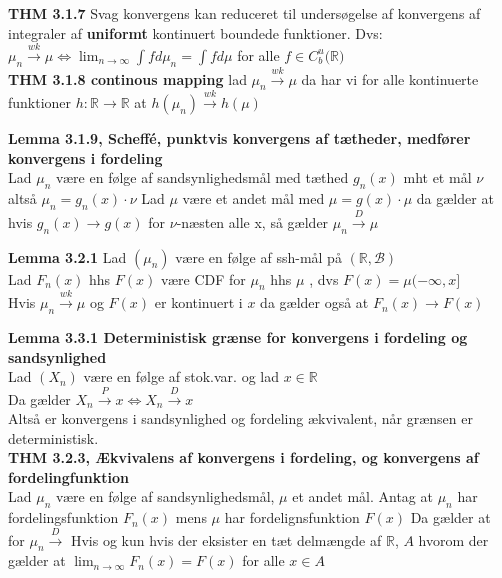 \textbf{THM 3.1.7}
Svag konvergens kan reduceret til undersøgelse af konvergens af integraler af \textbf{uniformt} kontinuert boundede funktioner. Dvs: $\mu_n  \xrightarrow{wk} \mu \Longleftrightarrow \lim_{n\to \infty} \int f d\mu_n = \int f d\mu $ for alle $f \in C_b^u (\mathbb{R)}$\\

\textbf{THM 3.1.8 continous mapping}
lad $\mu_n \xrightarrow{wk} \mu$ da har vi for alle kontinuerte funktioner $h:\mathbb{R}\to \mathbb{R}$ at $h(\mu_n) \xrightarrow{wk} h(\mu)$\newline

\textbf{Lemma 3.1.9, Scheffé, punktvis konvergens af tætheder, medfører konvergens i fordeling}\\
Lad $\mu_n$ være en følge af sandsynlighedsmål med tæthed $g_n(x)$ mht et mål $\nu$ altså $\mu_n = g_n(x) \cdot \nu$
Lad $\mu$ være et andet mål med $\mu=g(x)\cdot \mu$ da gælder at hvis $g_n(x) \rightarrow g(x)$ for $\nu$-næsten alle x, så gælder $\mu_n \xrightarrow{D} \mu$ \newline

\textbf{Lemma 3.2.1}
Lad $(\mu_n)$ være en følge af ssh-mål på $(\mathbb{R},\mathcal{B})$\\
Lad $F_n(x)$ hhs $F(x)$ være CDF for $\mu_n$ hhs $\mu$ , dvs $F(x)=\mu(-\infty,x]$ \\
Hvis $\mu_n \xrightarrow{wk} \mu$ og $F(x)$ er kontinuert i $x$ da gælder også at $F_n(x) \to F(x)$ 

\textbf{Lemma 3.3.1 Deterministisk grænse for konvergens i fordeling og sandsynlighed}\\
Lad $(X_n)$ være en følge af stok.var. og lad $x\in \mathbb{R}$\\
Da gælder $X_n \xrightarrow{P} x \Longleftrightarrow X_n \xrightarrow{D} x$ \\Altså er konvergens i sandsynlighed og fordeling ækvivalent, når grænsen er deterministisk.\newline \\

\textbf{THM 3.2.3, Ækvivalens af konvergens i fordeling, og konvergens af fordelingfunktion}\\
Lad $\mu_n$ være en følge af sandsynlighedsmål, $\mu$ et andet mål. Antag at $\mu_n$ har fordelingsfunktion $F_n(x)$ mens $\mu$ har fordelignsfunktion $F(x)$ Da gælder at for $\mu_n \xrightarrow{D}$ Hvis og kun hvis der eksister en tæt delmængde af $\mathbb{R}$, $A$ hvorom der gælder at $\lim_{n\to \infty}F_n(x) = F(x)$ for alle $x \in A$\newline

